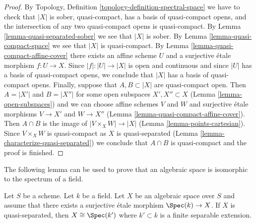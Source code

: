 \begin{proof}
By Topology, Definition \ref{topology-definition-spectral-space}
we have to check that $|X|$ is sober, quasi-compact, has a basis
of quasi-compact opens, and the intersection of any two
quasi-compact opens is quasi-compact. By
Lemma \ref{lemma-quasi-separated-sober} we see that $|X|$ is sober.
By Lemma \ref{lemma-quasi-compact-space} we see that $|X|$ is quasi-compact.
By Lemma \ref{lemma-quasi-compact-affine-cover} there exists an affine scheme
$U$ and a surjective \'etale morphism $f : U \to X$.
Since $|f| : |U| \to |X|$ is open and continuous and since $|U|$ has
a basis of quasi-compact opens, we conclude that $|X|$ has a basis
of quasi-compact opens. Finally, suppose that
$A, B \subset |X|$ are quasi-compact open. Then $A = |X'|$ and $B = |X''|$
for some open subspaces $X', X'' \subset X$ (Lemma \ref{lemma-open-subspaces})
and we can choose affine schemes $V$ and $W$ and surjective
\'etale morphisms $V \to X'$ and $W \to X''$
(Lemma \ref{lemma-quasi-compact-affine-cover}).
Then $A \cap B$ is the image of
$|V \times_X W| \to |X|$ (Lemma \ref{lemma-points-cartesian}).
Since $V \times_X W$ is quasi-compact as $X$ is quasi-separated
(Lemma \ref{lemma-characterize-quasi-separated})
we conclude that $A \cap B$ is quasi-compact and the proof is finished.
\end{proof}

\noindent
The following lemma can be used to prove that
an algebraic space is isomorphic to the spectrum of a field.

\begin{lemma}
\label{lemma-point-like-spaces}
Let $S$ be a scheme. Let $k$ be a field.
Let $X$ be an algebraic space over $S$ and assume that there exists
a surjective \'etale morphism $\Spec(k) \to X$.
If $X$ is quasi-separated, then $X \cong \Spec(k')$
where $k' \subset k$ is a finite separable extension.
\end{lemma}

